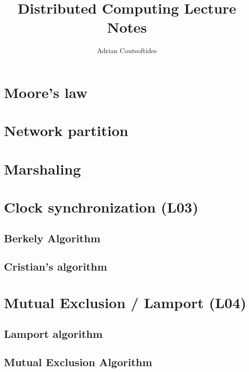 \documentclass{easyclass}
\begin{document}
\begin{titlepage}
    \title{Distributed Computing Lecture Notes}
    \author{Adrian Coutsoftides}
    \maketitle
\end{titlepage}

\tableofcontents

\chapter{Moore's law}

\chapter{Network partition}

\chapter{Marshaling}
\chapter{Clock synchronization (L03)}
\section{Berkely Algorithm}

\section{Cristian's algorithm}
\chapter{Mutual Exclusion / Lamport (L04)}
\section{Lamport algorithm}

\section{Mutual Exclusion Algorithm}
\end{document}
